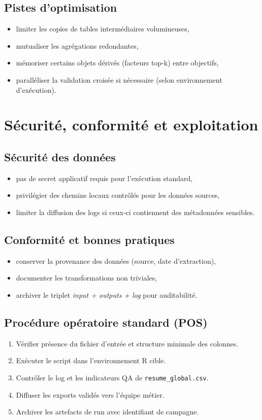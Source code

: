 \documentclass[11pt,a4paper]{article}
\begin{document}
\subsection{Pistes d'optimisation}
\begin{itemize}[leftmargin=1.2cm]
  \item limiter les copies de tables intermédiaires volumineuses,
  \item mutualiser les agrégations redondantes,
  \item mémoriser certains objets dérivés (facteurs top-k) entre objectifs,
  \item paralléliser la validation croisée si nécessaire (selon environnement d'exécution).
\end{itemize}

\section{Sécurité, conformité et exploitation}
\subsection{Sécurité des données}
\begin{itemize}[leftmargin=1.2cm]
  \item pas de secret applicatif requis pour l'exécution standard,
  \item privilégier des chemins locaux contrôlés pour les données sources,
  \item limiter la diffusion des logs si ceux-ci contiennent des métadonnées sensibles.
\end{itemize}

\subsection{Conformité et bonnes pratiques}
\begin{itemize}[leftmargin=1.2cm]
  \item conserver la provenance des données (source, date d'extraction),
  \item documenter les transformations non triviales,
  \item archiver le triplet \textit{input + outputs + log} pour auditabilité.
\end{itemize}

\subsection{Procédure opératoire standard (POS)}
\begin{enumerate}[leftmargin=1.2cm]
  \item Vérifier présence du fichier d'entrée et structure minimale des colonnes.
  \item Exécuter le script dans l'environnement R cible.
  \item Contrôler le log et les indicateurs QA de \texttt{resume\_global.csv}.
  \item Diffuser les exports validés vers l'équipe métier.
  \item Archiver les artefacts de run avec identifiant de campagne.
\end{enumerate}
\end{document}
